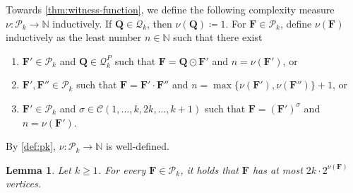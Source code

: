 \documentclass[11pt,a4paper]{article}
\theoremstyle{plain}
\newtheorem{lem}[thm]{Lemma}
\theoremstyle{remark}
\theoremstyle{definition}
\newcommand{\cyclicpermutations}{\mathscr{C}(1,\dots, k, 2k, \dots, k+1)}
\begin{document}
Towards \cref{thm:witness-function},
we define  the following complexity measure $\nu \colon \mathcal{P}_k \to \mathbb{N}$ inductively. If $\boldsymbol{Q} \in \mathcal{Q}_k$, then $\nu(\boldsymbol{Q}) \coloneqq 1$.
For $\boldsymbol{F} \in \mathcal{P}_k$, define $\nu(\boldsymbol{F})$ inductively as the least number $n \in \mathbb{N}$ such that there exist
\begin{enumerate}
	\item $\boldsymbol{F}' \in \mathcal{P}_k$ and $\boldsymbol{Q} \in \mathcal{Q}_k^P$ such that $\boldsymbol{F} = \boldsymbol{Q} \odot \boldsymbol{F}'$ and $n = \nu(\boldsymbol{F}')$, or
	\item $\boldsymbol{F}', \boldsymbol{F}'' \in \mathcal{P}_k$ such that $\boldsymbol{F} = \boldsymbol{F}' \cdot \boldsymbol{F}''$ and $n = \max\{ \nu(\boldsymbol{F}'), \nu(\boldsymbol{F}'')\} +1$, or
	\item $\boldsymbol{F}' \in \mathcal{P}_k$ and $\sigma \in \cyclicpermutations$ such that $\boldsymbol{F} = (\boldsymbol{F}')^\sigma$ and $n = \nu(\boldsymbol{F}')$.
\end{enumerate}
By \cref{def:pk}, $\nu \colon \mathcal{P}_k \to \mathbb{N}$ is well-defined.
\begin{lem} \label{lem:nu-size}
	Let $k \geq 1$.
	For every $\boldsymbol{F} \in \mathcal{P}_k$, it holds that $\boldsymbol{F}$ has at most $2k \cdot 2^{\nu(\boldsymbol{F})}$ vertices.
\end{lem}
\end{document}
